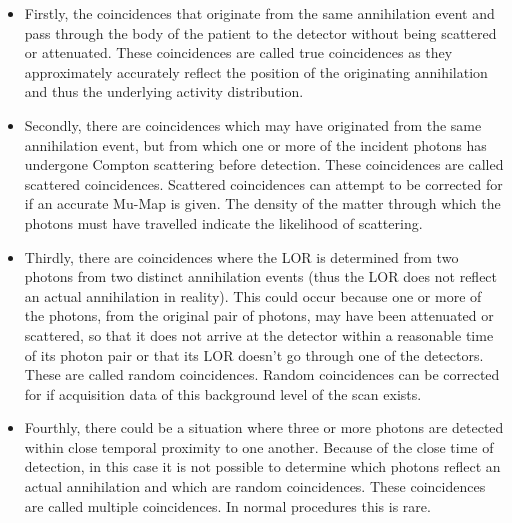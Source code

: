             \begin{itemize}
                \item Firstly, the coincidences that originate from the same annihilation event and pass through the body of the patient to the detector without being scattered or attenuated. These coincidences are called true coincidences as they approximately accurately reflect the position of the originating annihilation and thus the underlying activity distribution.
                
                \item Secondly, there are coincidences which may have originated from the same annihilation event, but from which one or more of the incident photons has undergone Compton scattering before detection. These coincidences are called scattered coincidences. Scattered coincidences can attempt to be corrected for if an accurate \gls{Mu-Map} is given. The density of the matter through which the photons must have travelled indicate the likelihood of scattering.
                
                \item Thirdly, there are coincidences where the \gls{LOR} is determined from two photons from two distinct annihilation events (thus the \gls{LOR} does not reflect an actual annihilation in reality). This could occur because one or more of the photons, from the original pair of photons, may have been attenuated or scattered, so that it does not arrive at the detector within a reasonable time of its photon pair or that its \gls{LOR} doesn't go through one of the detectors. %
                These are called random coincidences. Random coincidences can be corrected for if acquisition data of this background level of the scan exists.
                
                \item Fourthly, there could be a situation where three or more photons are detected within close temporal proximity to one another. Because of the close time of detection, in this case it is not possible to determine which photons reflect an actual annihilation and which are random coincidences. These coincidences are called multiple coincidences. In normal procedures this is rare. %
            \end{itemize}
            

